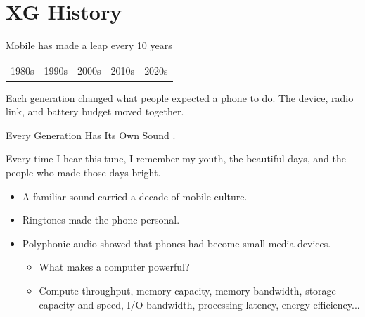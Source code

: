 
\section{XG History}

\begin{frame}{Mobile has made a leap every 10 years}
  \centering

  \vspace{1.0em}
  \begin{tabular}{@{}lllll@{}}
    1980s & 1990s & 2000s & 2010s & 2020s \\
  \end{tabular}

  \vspace{0.8em}
  \small
  Each generation changed what people expected a phone to do.
  The device, radio link, and battery budget moved together.
\end{frame}

\begin{frame}{Every Generation Has Its Own Sound}
  \Large
  .

  {\tiny
  Every time I hear this tune, I remember my youth, the beautiful days, and the people who made those days bright.}

  \vspace{0.8em}
  \normalsize
  \begin{itemize}
    \item A familiar sound carried a decade of mobile culture.
    \item Ringtones made the phone personal.
    \item Polyphonic audio showed that phones had become small media devices. 
    \begin{itemize}
      \item What makes a computer powerful?
      \item Compute throughput, memory capacity, memory bandwidth, storage capacity and speed, I/O bandwidth, processing latency, energy efficiency...
    \end{itemize}
  \end{itemize}

  
\end{frame}

